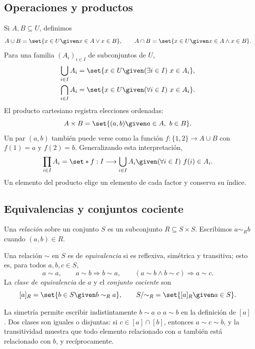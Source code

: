 \subsection{Operaciones y productos}
Si $A,B\subseteq U$, definimos
\[
A\cup B=\set{x\in U\given x\in A\lor x\in B},\qquad
A\cap B=\set{x\in U\given x\in A\land x\in B}.
\]
Para una familia $(A_i)_{i\in I}$ de subconjuntos de $U$,
\[
\begin{aligned}
\bigcup_{i\in I}A_i&=\set{x\in U\given(\exists i\in I)\ x\in A_i},\\
\bigcap_{i\in I}A_i&=\set{x\in U\given(\forall i\in I)\ x\in A_i}.
\end{aligned}
\]
El producto cartesiano registra elecciones ordenadas:
\[
A\times B=\set{(a,b)\given a\in A,\ b\in B}.
\]
Un par $(a,b)$ también puede verse como la función $f:\{1,2\}\to A\cup B$ con $f(1)=a$ y $f(2)=b$. Generalizando esta interpretación,
\[
\prod_{i\in I}A_i=
\set*{f:I\longrightarrow\bigcup_{i\in I}A_i\given
                 (\forall i\in I)\ f(i)\in A_i}.
\]
Un elemento del producto elige un elemento de cada factor y conserva su índice.

\subsection{Equivalencias y conjuntos cociente}
Una \emph{relación} sobre un conjunto $S$ es un subconjunto $R\subseteq S\times S$. Escribimos $a\sim_R b$ cuando $(a,b)\in R$.
\begin{defi}
Una relación $\sim$ en $S$ es de \emph{equivalencia} si es reflexiva, simétrica y transitiva; esto es, para todos $a,b,c\in S$,
\[
a\sim a,\qquad a\sim b\Rightarrow b\sim a,
\qquad (a\sim b\land b\sim c)\Rightarrow a\sim c.
\]
La \emph{clase de equivalencia} de $a$ y el \emph{conjunto cociente} son
\[
[a]_R=\set{b\in S\given b\sim_R a},\qquad
S/{\sim_R}=\set{[a]_R\given a\in S}.
\]
\end{defi}
La simetría permite escribir indistintamente $b\sim a$ o $a\sim b$ en la definición de $[a]$. Dos clases son iguales o disjuntas: si $c\in[a]\cap[b]$, entonces $a\sim c\sim b$, y la transitividad muestra que todo elemento relacionado con $a$ también está relacionado con $b$, y recíprocamente.


